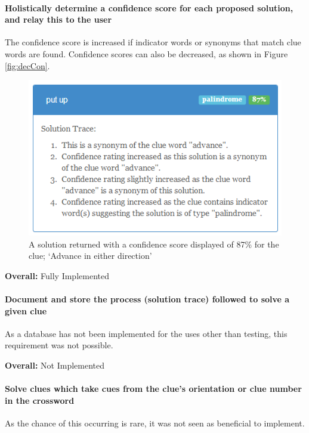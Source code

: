 \paragraph{Holistically determine a confidence score for each proposed
solution, and relay this to the user}

The confidence score is increased if indicator words or synonyms that match clue
words are found. Confidence scores can also be decreased, as shown in Figure
\ref{fig:decCon}.

\begin{figure}[H]
	\centering
	\includegraphics[scale=0.8]{evidence/confidence.png}
	\caption{A solution returned with a confidence score displayed of 87\% for the
	clue; `Advance in either direction'}
\end{figure}

{\bf Overall:} Fully Implemented


\paragraph{Document and store the process (solution trace) followed to solve a
given clue}

As a database has not been implemented for the uses other than testing, this
requirement was not possible.

{\bf Overall:} Not Implemented


\paragraph{Solve clues which take cues from the clue's orientation or clue
number in the crossword}

As the chance of this occurring is rare, it was not seen as beneficial to
implement.

